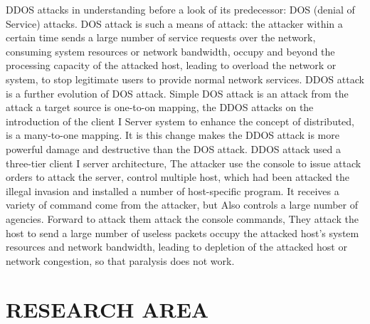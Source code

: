 \documentclass[letterpaper, 10 pt, conference]{ieeeconf}  %
\begin{document}
DDOS attacks in understanding before a look of its predecessor: DOS (denial of Service) attacks. DOS attack is such a means of attack: the attacker within a certain time sends a large number of service requests over the network, consuming system resources or network bandwidth, occupy and beyond the processing capacity of the attacked host, leading to overload the network or system, to stop legitimate users to provide normal network services. DDOS attack is a further evolution of DOS attack. Simple DOS attack is an attack from the attack a target source is one-to-on mapping, the DDOS attacks on the introduction of the client I Server system to enhance the concept of distributed, is a many-to-one mapping. It is this change makes the DDOS attack is more powerful damage and destructive than the DOS attack. DDOS attack used a three-tier client I server architecture, The attacker use the console to issue attack orders to attack the server, control multiple host, which had been attacked the illegal invasion and installed a number of host-specific program. It receives a variety of command come from the attacker, but Also controls a large number of agencies. Forward to attack them attack the console commands, They attack the host to send a large number of useless packets occupy the attacked host's system resources and network bandwidth, leading to depletion of the attacked host or network congestion, so that paralysis does not work.

 

\section{  RESEARCH AREA}
\end{document}
